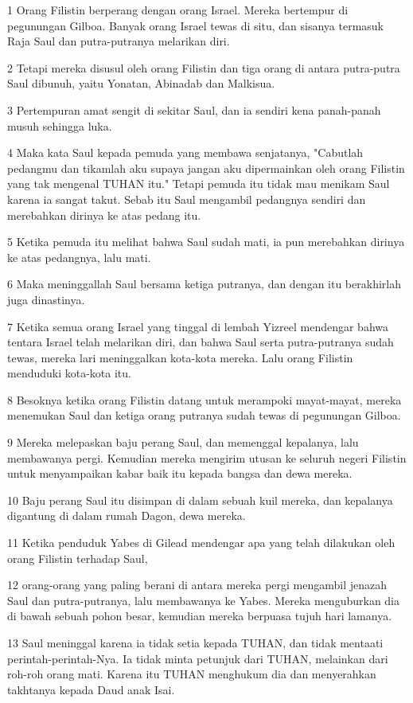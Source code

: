 \par 1 Orang Filistin berperang dengan orang Israel. Mereka bertempur di pegunungan Gilboa. Banyak orang Israel tewas di situ, dan sisanya termasuk Raja Saul dan putra-putranya melarikan diri.
\par 2 Tetapi mereka disusul oleh orang Filistin dan tiga orang di antara putra-putra Saul dibunuh, yaitu Yonatan, Abinadab dan Malkisua.
\par 3 Pertempuran amat sengit di sekitar Saul, dan ia sendiri kena panah-panah musuh sehingga luka.
\par 4 Maka kata Saul kepada pemuda yang membawa senjatanya, "Cabutlah pedangmu dan tikamlah aku supaya jangan aku dipermainkan oleh orang Filistin yang tak mengenal TUHAN itu." Tetapi pemuda itu tidak mau menikam Saul karena ia sangat takut. Sebab itu Saul mengambil pedangnya sendiri dan merebahkan dirinya ke atas pedang itu.
\par 5 Ketika pemuda itu melihat bahwa Saul sudah mati, ia pun merebahkan dirinya ke atas pedangnya, lalu mati.
\par 6 Maka meninggallah Saul bersama ketiga putranya, dan dengan itu berakhirlah juga dinastinya.
\par 7 Ketika semua orang Israel yang tinggal di lembah Yizreel mendengar bahwa tentara Israel telah melarikan diri, dan bahwa Saul serta putra-putranya sudah tewas, mereka lari meninggalkan kota-kota mereka. Lalu orang Filistin menduduki kota-kota itu.
\par 8 Besoknya ketika orang Filistin datang untuk merampoki mayat-mayat, mereka menemukan Saul dan ketiga orang putranya sudah tewas di pegunungan Gilboa.
\par 9 Mereka melepaskan baju perang Saul, dan memenggal kepalanya, lalu membawanya pergi. Kemudian mereka mengirim utusan ke seluruh negeri Filistin untuk menyampaikan kabar baik itu kepada bangsa dan dewa mereka.
\par 10 Baju perang Saul itu disimpan di dalam sebuah kuil mereka, dan kepalanya digantung di dalam rumah Dagon, dewa mereka.
\par 11 Ketika penduduk Yabes di Gilead mendengar apa yang telah dilakukan oleh orang Filistin terhadap Saul,
\par 12 orang-orang yang paling berani di antara mereka pergi mengambil jenazah Saul dan putra-putranya, lalu membawanya ke Yabes. Mereka menguburkan dia di bawah sebuah pohon besar, kemudian mereka berpuasa tujuh hari lamanya.
\par 13 Saul meninggal karena ia tidak setia kepada TUHAN, dan tidak mentaati perintah-perintah-Nya. Ia tidak minta petunjuk dari TUHAN, melainkan dari roh-roh orang mati. Karena itu TUHAN menghukum dia dan menyerahkan takhtanya kepada Daud anak Isai.

